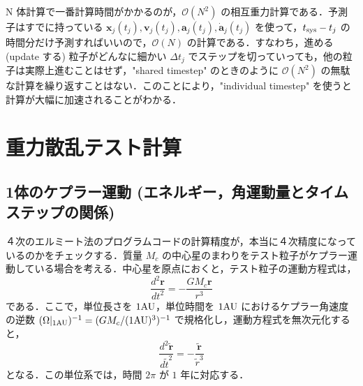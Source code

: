 \documentclass[11pt,a4paper,oneside,onecolumn]{jreport}
\begin{document}
N 体計算で一番計算時間がかかるのが，$\mathcal{O} (N^2)$ の相互重力計算である．予測子はすでに持っている ${\bm x}_j (t_j), {\bm v}_j (t_j), {\bm a}_j (t_j), \dot{{\bm a}}_j (t_j)$ を使って，$t_{{\rm sys}} - t_j$ の時間分だけ予測すればいいので，$\mathcal{O} (N)$ の計算である．すなわち，進める (update する) 粒子がどんなに細かい $\Delta t_j$ でステップを切っていっても，他の粒子は実際上進むことはせず，"shared timestep" のときのように $\mathcal{O} (N^2)$ の無駄な計算を繰り返すことはない．このことにより，"individual timestep" を使うと計算が大幅に加速されることがわかる．

\section{重力散乱テスト計算}
\subsection{1体のケプラー運動 (エネルギー，角運動量とタイムステップの関係)}
４次のエルミート法のプログラムコードの計算精度が，本当に４次精度になっているのかをチェックする．質量 $M_c$ の中心星のまわりをテスト粒子がケプラー運動している場合を考える．中心星を原点におくと，テスト粒子の運動方程式は，
\begin{equation}
\frac{d^2 {\bm r}}{d t^2} = - \frac{G M_c {\bm r}}{r^3}
\end{equation}
である．ここで，単位長さを $1 {\rm AU}$，単位時間を $1 {\rm AU}$ におけるケプラー角速度の逆数 $(\Omega |_{1 {\rm AU}})^{-1} = (G  M_c / (1 {\rm AU})^3)^{-1}$ で規格化し，運動方程式を無次元化すると，
\begin{equation}
\frac{d^2 \tilde{\bm r}}{d  \tilde{t}^2} = - \frac{\tilde{\bm r}}{\tilde{r}^3}
\end{equation}
となる．この単位系では，時間 $2 \pi$ が $1$ 年に対応する．
\end{document}
